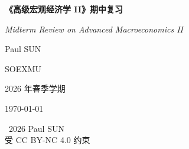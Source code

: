 \begin{titlepage}
  \centering
  \vspace*{2.5cm}

  {\Huge\bfseries 《高级宏观经济学 II》期中复习}

  \vspace{1cm}

  {\Large\itshape Midterm Review on Advanced Macroeconomics II}

  \vspace{4cm}

  {\Large Paul SUN}

  \vspace{0.1cm}

  {\large SOE\hspace{0.35em}\textperiodcentered\hspace{0.35em}XMU}

  \vspace{0.1cm}

  {}

  \vspace{1cm}

  {\large 2026 年春季学期}

  \vfill

  {\today}

  \vspace{0.5cm}

  {\small \textcopyright\ 2026 Paul SUN\\受 CC BY-NC 4.0 约束}
\end{titlepage}
